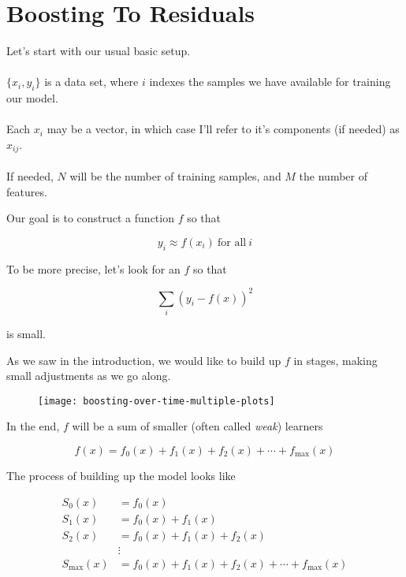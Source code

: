 \section{Boosting To Residuals}

\begin{frame}
Let's start with our usual basic setup.\\~\\

$\{ x_i, y_i \}$ is a data set, where $i$ indexes the samples we have available for training our model.\\~\\

Each $x_i$ may be a vector, in which case I'll refer to it's components (if needed) as $x_{ij}$.\\~\\

If needed, $N$ will be the number of training samples, and $M$ the number of features.
\end{frame}
%

\begin{frame}
Our goal is to construct a function $f$ so that

$$ y_i \approx f(x_i) \ \text{for all} \ i $$

\end{frame}
%

\begin{frame}
To be more precise, let's look for an $f$ so that 

$$ \sum_i \left( y_i - f(x) \right)^2 $$

is small.
\end{frame}
%

\begin{frame}
As we saw in the introduction, we would like to build up $f$ in stages, making small adjustments as we go along.

  \begin{figure}
    \texttt{[image: boosting-over-time-multiple-plots]}
  \end{figure}
  
\end{frame}
%

\begin{frame}
In the end, $f$ will be a sum of smaller (often called \textit{weak}) learners

$$ f(x) = f_0(x) + f_1(x) + f_2(x) + \cdots + f_{\text{max}}(x) $$

The process of building up the model looks like

\begin{align*}
    S_0(x) &= f_0(x) \\
    S_1(x) &= f_0(x) + f_1(x) \\
    S_2(x) &= f_0(x) + f_1(x) + f_2(x) \\
    &\vdots \\
    S_{\text{max}}(x) &= f_0(x) + f_1(x) + f_2(x) + \cdots + f_{\text{max}}(x) \\
\end{align*}
\end{frame} 
%

